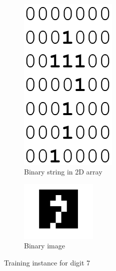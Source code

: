 \documentclass[paper=letter, fontsize=10pt]{scrartcl} %
\numberwithin{equation}{section} %
\numberwithin{figure}{section} %
\numberwithin{table}{section} %
\begin{document}
        ~ %
\begin{figure}[h]
        \centering 
       \begin{subfigure}[b]{0.4\textwidth}
\centering
                \includegraphics[scale=0.25]{digit7raw.png}
                \caption{Binary string in 2D array}
                \label{fig:seven2d}
        \end{subfigure}
\begin{subfigure}[b]{0.4\textwidth}
\centering
                \includegraphics[trim=1cm 1cm 1cm 1cm, width=0.4\textwidth]{digit7.png}
                \caption{Binary image}
                \label{fig:sevenim}
        \end{subfigure}
        \caption{Training instance for digit 7}\label{fig:animals}
\end{figure}
\end{document}
